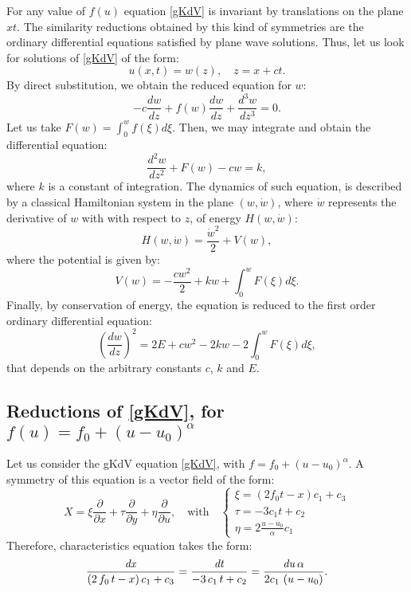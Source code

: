 \documentclass[
11pt,%
tightenlines,%
twoside,%
onecolumn,%
nofloats,%
nobibnotes,%
nofootinbib,%
superscriptaddress,%
noshowpacs,%
centertags]%
{revtex4}
\begin{document}
For any value of $f(u)$ equation \eqref{gKdV} is invariant by translations on the plane $xt$. The similarity reductions obtained by this kind of symmetries are the ordinary differential equations satisfied by plane wave solutions. Thus, let us look for 
solutions of \eqref{gKdV} of the form:
\begin{equation}
u(x,t) = w(z) , \quad z = x + ct.
\end{equation}
By direct substitution, we obtain the reduced equation for $w$:
\begin{equation}
-c\frac{dw}{dz} + f(w)\frac{dw}{dz} + \frac{d^3 w}{dz^3}  = 0.
\end{equation}
Let us take $F(w) = \int_0^w f(\xi)d\xi$. Then, we may integrate and obtain the differential equation:
\begin{equation}
\frac{d^2 w}{dz^2} + F(w) - cw = k,
\end{equation}
where $k$ is a constant of integration. The dynamics of such equation, is described by a classical Hamiltonian system in the plane $(w,\dot w)$, where $\dot w$ represents the
derivative of $w$ with with respect to $z$, of energy $H(w,\dot w)$:
\begin{equation}\label{hamiltonian}
H(w,\dot w) = \frac{\dot w^2}{2} + V(w),
\end{equation}
where the potential is given by:
\begin{equation}\label{potential}
V(w) = -\frac{cw^2}{2} + kw + \int_0^w F(\xi)d\xi.
\end{equation}
Finally, by conservation of energy, the equation is reduced to the first order ordinary differential equation:
\begin{equation}\label{1st_order_pw}
\left(\frac{dw}{dz}\right)^2 = 2E + cw^2 - 2kw - 2\int_0^w F(\xi)d\xi,
\end{equation}
that depends on the arbitrary constants $c$, $k$ and $E$.

\subsection{Reductions of \eqref{gKdV}, for  $f(u) = f_0 + (u - u_0)^\alpha$}

Let us consider the gKdV equation \eqref{gKdV}, with $f = f_0 + (u-u_0)^\alpha$. A symmetry of this equation is a vector field of the form:
\begin{equation}
X = \xi \frac{\partial}{\partial x} + \tau   \frac{\partial}{\partial y} + \eta  \frac{\partial}{\partial u}, \quad\mbox{with}\quad  \begin{cases}
\xi =(2f_0t-x)c_1+c_3 \\
\tau = -3c_1t+c_2 \\
\eta =2 \frac{u-u_0}{\alpha} c_1
\end{cases}
\end{equation}
Therefore, characteristics equation takes the form:
\begin{equation}\label{car1}
{\frac{{\it dx}}{\left(2\,f_{0}\,t-x\right)c_{1}+c_{3}}}={\frac{{\it dt}}{-3\,c_{1}\,t+c_{2}}}={\frac{{\it du}\,\alpha}{2c_{1}\,\left(u-u_{0}\right)}}.
\end{equation}
\end{document}
